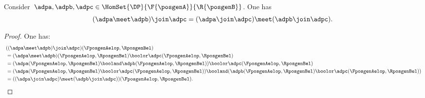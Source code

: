 \begin{lemma}
	\label{lem:vee_wedge}
	Consider~$\adpa,\adpb,\adpc\in \HomSet{\DP}{\F{\posgenA}}{\R{\posgenB}}$.
	One has
	\begin{equation*}
		(\adpa \meet \adpb)
		\join \adpc=(\adpa \join \adpc) \meet (\adpb\join \adpc).
	\end{equation*}
\end{lemma}
\begin{proof}
	One has:
	\begin{equation*}
		\begin{aligned}
			~ & ((\adpa \meet \adpb)\join \adpc)(\FposgenAelop,\RposgenBel)                                                                                                       \\
			  & =
			(\adpa \meet \adpb)(\FposgenAelop,\RposgenBel)\boolor \adpc(\FposgenAelop,\RposgenBel)                                                                                \\
			  & =(\adpa(\FposgenAelop,\RposgenBel) \booland \adpb(\FposgenAelop,\RposgenBel))\boolor \adpc(\FposgenAelop,\RposgenBel)                                             \\
			  & =(\adpa(\FposgenAelop,\RposgenBel) \boolor  \adpc(\FposgenAelop,\RposgenBel)) \booland (\adpb(\FposgenAelop,\RposgenBel)\boolor \adpc(\FposgenAelop,\RposgenBel)) \\
			  & =((\adpa \join \adpc) \meet (\adpb\join \adpc))(\FposgenAelop,\RposgenBel).
		\end{aligned}
	\end{equation*}
\end{proof}

